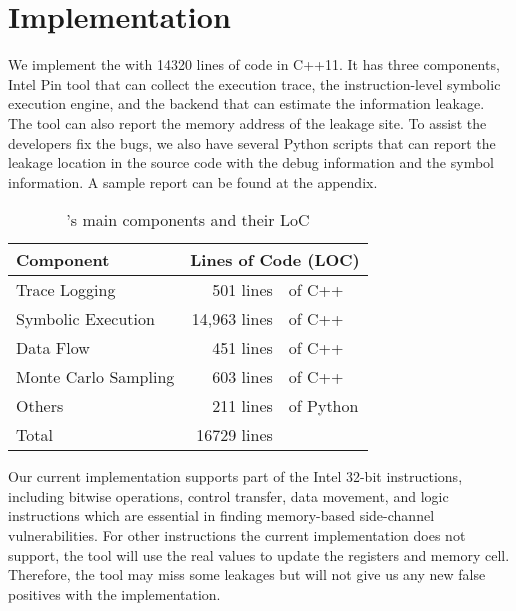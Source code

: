 \section{Implementation}
We implement the \tool{} with 14320 lines of code in C++11. 
It has three components, Intel
Pin tool that can collect the execution trace, 
the instruction-level symbolic execution
engine, and the backend that can estimate the information leakage. 
The tool can also report the memory address of the leakage site. 
To assist the developers fix the bugs,
we also have several Python scripts that can report the leakage 
location in the source code with the debug information and the symbol 
information. A sample report can be found at the appendix.

\begin{table}[h]
    \centering
    \begin{tabular}{lr@{~}@{}l}
    \hline
    Component                            & \multicolumn{2}{c}{Lines of Code (LOC)}    \\ \hline
    Trace Logging                        & 501 lines &of C++   \\ 
    Symbolic Execution & 14,963 lines &of C++ \\ 
    Data Flow & 451 lines &of C++                      \\
    Monte Carlo Sampling                 & 603 lines &of C++   \\ 
    Others                               & 211 lines &of Python    \\ \hline
    Total    & 16729 lines & \\\hline
    \end{tabular}
    \caption{\tool{}'s main components and their LoC}
\end{table}

Our current implementation supports part of the Intel 32-bit instructions, 
including bitwise operations, control transfer, data movement, and logic 
instructions which are essential in finding memory-based side-channel 
vulnerabilities. For other 
instructions the current implementation does not support, 
the tool will use the real values to update the registers and memory cell.
Therefore, the tool may miss some leakages but will not give us any new
false positives with the implementation.
